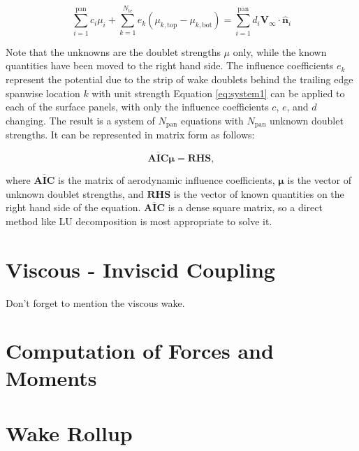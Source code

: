 \documentclass[11pt]{article}
\begin{document}
\begin{equation}
  \sum_{i=1}^{\text{pan}}c_i\mu_i 
+ \sum_{k=1}^{N_\text{te}}e_k\left(\mu_{k,\text{top}} - \mu_{k,\text{bot}}\right)
= \sum_{i=1}^{\text{pan}}d_i\mathbf{V}_\infty\cdot\mathbf{\hat{n}}_i
\label{eq:system1}
\end{equation}

\noindent Note that the unknowns are the doublet strengths $\mu$ only, while the
known quantities have been moved to the right hand side. The influence
coefficients $e_k$ represent the potential due to the strip of wake doublets
behind the trailing edge spanwise location $k$ with unit strength
Equation \ref{eq:system1} can be
applied to each of the surface panels, with only the influence coefficients
$c$, $e$, and $d$ changing. The result is a system of
$N_{\text{pan}}$ equations with $N_{\text{pan}}$ unknown doublet strengths. It
can be represented in matrix form as follows:

\begin{equation}
\mathbf{\overline{AIC}}\boldsymbol{\mu} = \mathbf{RHS},
\label{eq:system2}
\end{equation}

\noindent where $\mathbf{\overline{AIC}}$ is the matrix of aerodynamic influence
coefficients,
$\boldsymbol{\mu}$ is the vector of unknown doublet strengths, and $\mathbf{RHS}$ is the
vector of known quantities on the right hand side of the equation. $\mathbf{\overline{AIC}}$
is a
dense square matrix, so a direct method like LU decomposition is most appropriate to solve
it.

\section{Viscous - Inviscid Coupling}\label{sec:viscous_coupling}

Don't forget to mention the viscous wake.

\section{Computation of Forces and Moments}

\section{Wake Rollup}\label{sec:rollup}
\end{document}
